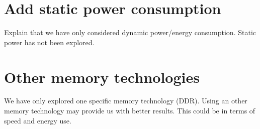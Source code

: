 \documentclass[11pt]{report}
\begin{document}
\section{Add static power consumption}
Explain that we have only considered dynamic power/energy consumption.
Static power has not been explored.

\section{Other memory technologies}
We have only explored one specific memory technology (DDR).
Using an other memory technology may provide us with better results.
This could be in terms of speed and energy use.

\section{}
% 
% 
% 
% 

% 
% 
% 
% 
% 
% 
% 
% 
% 




% 


% 
% 
% 
% 
% 
% 
% 
% 

\newpage
\printbibliography[heading=bibintoc]
\end{document}
